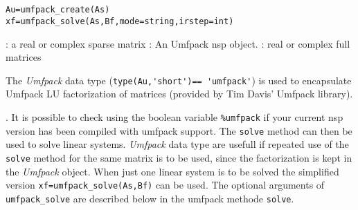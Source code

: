 
\begin{mandesc}
  \\
  \\
\end{mandesc}

\begin{calling_sequence}
\begin{verbatim}
Au=umfpack_create(As)
xf=umfpack_solve(As,Bf,mode=string,irstep=int)
\end{verbatim}
\end{calling_sequence}
\begin{parameters}
  \begin{varlist}
    : a real or complex sparse matrix
    : An Umfpack nsp object.
    : real or complex full matrices 
  \end{varlist}
\end{parameters}

\begin{mandescription}
The \emph{Umfpack} data type (\verb+type(Au,'short')== 'umfpack'+) is used to 
encapsulate Umfpack LU factorization of matrices (provided by Tim Davis' Umfpack library). 
\end{mandescription}. It is possible to check using the boolean variable \verb+%umfpack+ 
if your current nsp version has been compiled with umfpack support. The \verb+solve+ method 
can then be used to solve linear systems. \emph{Umfpack} data type are usefull if 
repeated use of the \verb+solve+ method for the same matrix is to be used, 
since the factorization is kept in the \emph{Umfpack} object. When just one linear 
system is to be solved the simplified version \verb+xf=umfpack_solve(As,Bf)+ can be used. 
The optional arguments of \verb+umfpack_solve+ are described below in the umfpack methode 
\verb+solve+.

